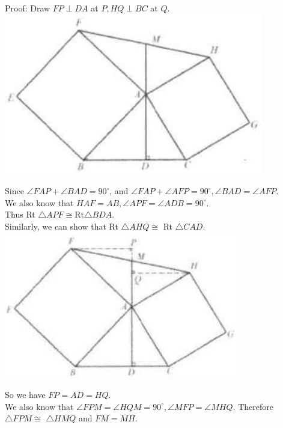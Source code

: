 \documentclass[10pt]{article}
\begin{document}
Proof:
Draw \(F P \perp D A\) at \(P, H Q \perp B C\) at \(Q\).\\
\includegraphics[max width=\textwidth, center]{2025_04_17_97bc1f7e44d93c271a88g-084}

Since \(\angle F A P+\angle B A D=90^{\circ}\), and \(\angle F A P+\angle A F P=90^{\circ}, \angle B A D=\angle A F P\).\\
We also know that \(H A F=A B, \angle A P F=\angle A D B=90^{\circ}\).\\
Thus Rt \(\triangle A P F \cong \mathrm{Rt} \triangle B D A\).\\
Similarly, we can show that Rt \(\triangle A H Q \cong\) Rt \(\triangle C A D\).\\
\includegraphics[max width=\textwidth, center]{2025_04_17_97bc1f7e44d93c271a88g-084(2)}

So we have \(F P=A D=H Q\).\\
We also know that \(\angle F P M=\angle H Q M=90^{\circ}, \angle M F P=\angle M H Q\). Therefore \(\triangle F P M \cong\) \(\triangle H M Q\) and \(F M=M H\).
\end{document}
